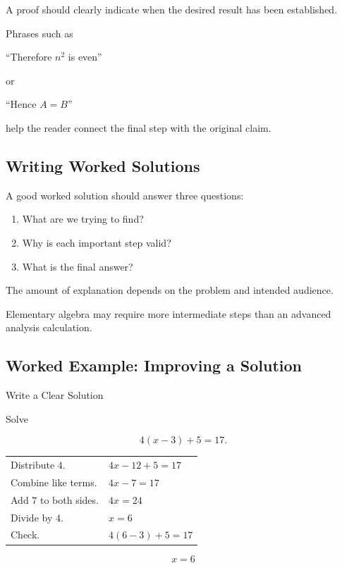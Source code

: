 A proof should clearly indicate when the desired result has been established.

Phrases such as

\begin{center}
``Therefore \(n^2\) is even''
\end{center}

or

\begin{center}
``Hence \(A=B\)''
\end{center}

help the reader connect the final step with the original claim.

\subsection{Writing Worked Solutions}
\label{subsec:writing-worked-solutions}

A good worked solution should answer three questions:

\begin{enumerate}
    \item What are we trying to find?
    \item Why is each important step valid?
    \item What is the final answer?
\end{enumerate}

The amount of explanation depends on the problem and intended audience.

Elementary algebra may require more intermediate steps than an advanced
analysis calculation.

\subsection{Worked Example: Improving a Solution}
\label{subsec:worked-improving-solution}

\begin{workedexamplebox}{Write a Clear Solution}

Solve

\[ 4(x-3)+5=17. \]

\begin{tabularx}{\textwidth}{@{}>{\raggedright\arraybackslash}p{}X@{}}
Distribute \(4\). & \(4x-12+5=17\)\\
Combine like terms. & \(4x-7=17\)\\
Add \(7\) to both sides. & \(4x=24\)\\
Divide by \(4\). & \(x=6\)\\
Check. & \(4(6-3)+5=17\)
\end{tabularx}

\begin{answerbox}
\[ x=6 \]
\end{answerbox}
\end{workedexamplebox}

